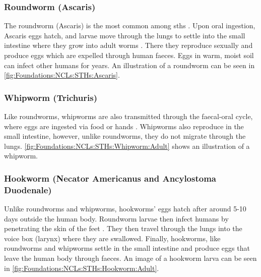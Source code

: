 \subsubsection{Roundworm (Ascaris)}
\label{sec:Foundations:NTDs:STHs:Ascaris}

The roundworm (Ascaris) is the most common among \acp{sth} \cite{jamison2006helminth}. Upon oral ingestion, Ascaris eggs hatch, and larvae move through the lungs to settle into the small intestine where they grow into adult worms \cite{jourdan2018soiltransmitted}. There they reproduce sexually and produce eggs which are expelled through human faeces. Eggs in warm, moist soil can infect other humans for years. An illustration of a roundworm can be seen in \autoref{fig:Foundations:NCLs:STHs:Ascaris}.

\subsubsection{Whipworm (Trichuris)}
\label{sec:Foundations:NTDs:STHs:Whipworm}

Like roundworms, whipworms are also transmitted through the faecal-oral cycle, where eggs are ingested via food or hands \cite{jourdan2018soiltransmitted}. Whipworms also reproduce in the small intestine, however, unlike roundworms, they do not migrate through the lungs. \autoref{fig:Foundations:NCLs:STHs:Whipworm:Adult} shows an illustration of a whipworm.

\subsubsection{Hookworm (Necator Americanus and Ancylostoma Duodenale)}
\label{sec:Foundations:NTDs:STHs:Hookworm}

Unlike roundworms and whipworms, hookworms' eggs hatch after around 5-10 days outside the human body. Roundworm larvae then infect humans by penetrating the skin of the feet \cite{jourdan2018soiltransmitted}. They then travel through the lungs into the voice box (larynx) where they are swallowed. Finally, hookworms, like roundworms and whipworms settle in the small intestine and produce eggs that leave the human body through faeces. An image of a hookworm larva can be seen in \autoref{fig:Foundations:NCLs:STHs:Hookworm:Adult}.

